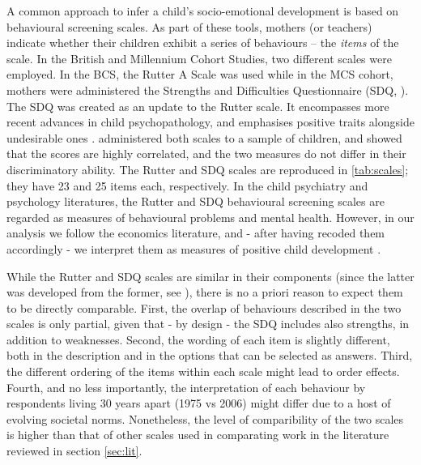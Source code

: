 A common approach to infer a child's socio-emotional development is based on behavioural screening scales. As part of these tools, mothers (or teachers) indicate whether their children exhibit a series of behaviours -- the \emph{items} of the scale. In the British and Millennium Cohort Studies, two different scales were employed. In the BCS, the Rutter A Scale was used \citep{Rutter1970} while in the MCS cohort, mothers were  administered the Strengths and Difficulties Questionnaire (SDQ, \citealp{Goodman1994,Goodman1997}). The SDQ was created as an update to the Rutter scale. It encompasses more recent advances in child psychopathology, and emphasises positive traits alongside undesirable ones \citep{Stone2010}. \citet{Goodman1997} administered both scales to a sample of children, and showed that the scores are highly correlated, and the two measures do not differ in their discriminatory ability. The Rutter and SDQ scales are reproduced in \autoref{tab:scales}; they have 23 and 25 items each, respectively. In the child psychiatry and psychology literatures, the Rutter and SDQ behavioural screening scales are regarded as measures of behavioural problems and mental health. However, in our analysis we follow the economics literature, and - after having recoded them accordingly - we interpret them as measures of positive child development \citep{Goodman2011}.

While the Rutter and SDQ scales are similar in their components (since the latter was developed from the former, see \citet{Goodman1994}), there is no a priori reason to expect them to be directly comparable. First, the overlap of behaviours described in the two scales is only partial, given that - by design - the SDQ includes also strengths, in addition to weaknesses. Second, the wording of each item is slightly different, both in the description and in the options that can be selected as answers. Third, the different ordering of the items within each scale might lead to order effects. Fourth, and no less importantly, the interpretation of each behaviour by respondents living 30 years apart (1975 vs 2006) might differ due to a host of evolving societal norms. Nonetheless, the level of comparibility of the two scales is higher than that of other scales used in comparating work in the literature reviewed in section \ref{sec:lit}.


